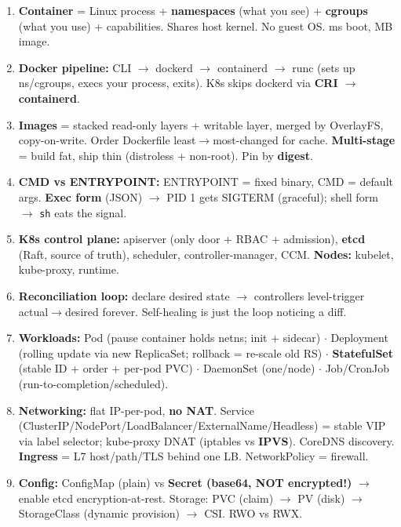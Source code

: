 \documentclass[11pt]{article}
\providecommand{\tightlist}{\setlength{\itemsep}{1pt}\setlength{\parskip}{0pt}}
\begin{document}
\begin{enumerate}
\def\labelenumi{\arabic{enumi}.}
\tightlist
\item
  \textbf{Container} = Linux process + \textbf{namespaces} (what you see) + \textbf{cgroups} (what you use) + capabilities. Shares host kernel. No guest OS. ms boot, MB image.
\item
  \textbf{Docker pipeline:} CLI \(\rightarrow\) dockerd \(\rightarrow\) containerd \(\rightarrow\) runc (sets up ns/cgroups, exec\textquotesingle s your process, exits). K8s skips dockerd via \textbf{CRI \(\rightarrow\) containerd}.
\item
  \textbf{Images} = stacked read-only layers + writable layer, merged by OverlayFS, copy-on-write. Order Dockerfile least\(\rightarrow\)most-changed for cache. \textbf{Multi-stage} = build fat, ship thin (distroless + non-root). Pin by \textbf{digest}.
\item
  \textbf{CMD vs ENTRYPOINT:} ENTRYPOINT = fixed binary, CMD = default args. \textbf{Exec form} (JSON) \(\rightarrow\) PID 1 gets SIGTERM (graceful); shell form \(\rightarrow\) \texttt{sh} eats the signal.
\item
  \textbf{K8s control plane:} apiserver (only door + RBAC + admission), \textbf{etcd} (Raft, source of truth), scheduler, controller-manager, CCM. \textbf{Nodes:} kubelet, kube-proxy, runtime.
\item
  \textbf{Reconciliation loop:} declare desired state \(\rightarrow\) controllers level-trigger actual\(\rightarrow\)desired forever. Self-healing is just the loop noticing a diff.
\item
  \textbf{Workloads:} Pod (pause container holds netns; init + sidecar) \(\cdot\) Deployment (rolling update via new ReplicaSet; rollback = re-scale old RS) \(\cdot\) \textbf{StatefulSet} (stable ID + order + per-pod PVC) \(\cdot\) DaemonSet (one/node) \(\cdot\) Job/CronJob (run-to-completion/scheduled).
\item
  \textbf{Networking:} flat IP-per-pod, \textbf{no NAT}. Service (ClusterIP/NodePort/LoadBalancer/ExternalName/Headless) = stable VIP via label selector; kube-proxy DNAT (iptables vs \textbf{IPVS}). CoreDNS discovery. \textbf{Ingress} = L7 host/path/TLS behind one LB. NetworkPolicy = firewall.
\item
  \textbf{Config:} ConfigMap (plain) vs \textbf{Secret (base64, NOT encrypted!)} \(\rightarrow\) enable etcd encryption-at-rest. Storage: PVC (claim) \(\rightarrow\) PV (disk) \(\rightarrow\) StorageClass (dynamic provision) \(\rightarrow\) CSI. RWO vs RWX.

\end{enumerate}
\end{document}
